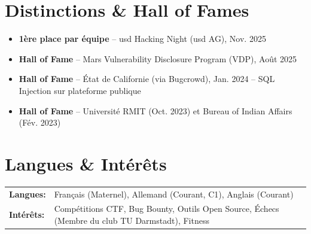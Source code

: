 \documentclass[a4paper,10pt]{article}
\newcommand{\hskills}[1]{\textbf{#1}}
\newenvironment{zitemize}{
    \begin{itemize}[leftmargin=*, labelsep=0.5em, itemsep=0pt, parsep=1pt]
}{\end{itemize}\vspace{-0.2cm}}
\begin{document}
\section{Distinctions \& Hall of Fames}
\begin{zitemize}
    \item \textbf{1ère place par équipe} -- usd Hacking Night (usd AG), Nov. 2025
    \item \textbf{Hall of Fame} -- Mars Vulnerability Disclosure Program (VDP), Août 2025
    \item \textbf{Hall of Fame} -- État de Californie (via Bugcrowd), Jan. 2024 -- SQL Injection sur plateforme publique
    \item \textbf{Hall of Fame} -- Université RMIT (Oct. 2023) et Bureau of Indian Affairs (Fév. 2023)
\end{zitemize}

\section{Langues \& Intérêts}
\begin{tabular}{>{\raggedright\arraybackslash}p{10em} p{38em}}
    \hskills{Langues:} & Français (Maternel), Allemand (Courant, C1), Anglais (Courant) \\
    \hskills{Intérêts:} & Compétitions CTF, Bug Bounty, Outils Open Source, Échecs (Membre du club TU Darmstadt), Fitness \\
\end{tabular}
\end{document}
